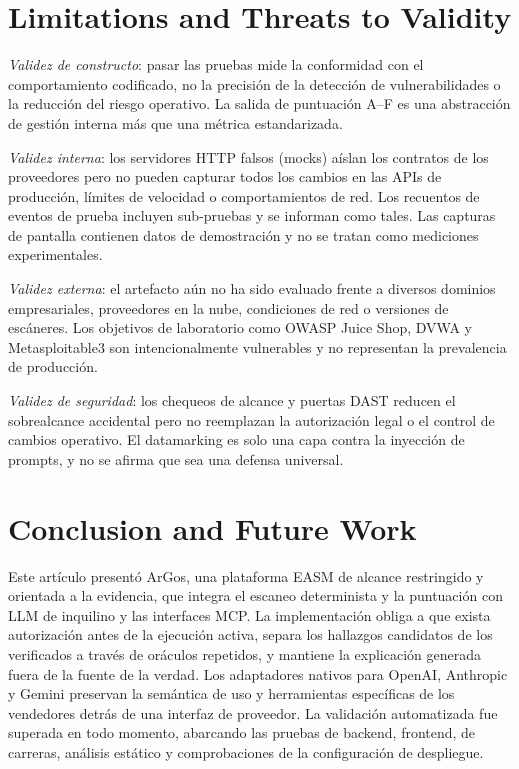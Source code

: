 \documentclass[conference,a4paper]{IEEEtran}
\newcommand{\argos}{ArGos\xspace}
\begin{document}
\section{Limitations and Threats to Validity}

\textit{Validez de constructo}: pasar las pruebas mide la conformidad con el comportamiento codificado, no la precisión de la detección de vulnerabilidades o la reducción del riesgo operativo. La salida de puntuación A--F es una abstracción de gestión interna más que una métrica estandarizada.

\textit{Validez interna}: los servidores HTTP falsos (mocks) aíslan los contratos de los proveedores pero no pueden capturar todos los cambios en las APIs de producción, límites de velocidad o comportamientos de red. Los recuentos de eventos de prueba incluyen sub-pruebas y se informan como tales. Las capturas de pantalla contienen datos de demostración y no se tratan como mediciones experimentales.

\textit{Validez externa}: el artefacto aún no ha sido evaluado frente a diversos dominios empresariales, proveedores en la nube, condiciones de red o versiones de escáneres. Los objetivos de laboratorio como OWASP Juice Shop, DVWA y Metasploitable3 son intencionalmente vulnerables y no representan la prevalencia de producción.

\textit{Validez de seguridad}: los chequeos de alcance y puertas DAST reducen el sobrealcance accidental pero no reemplazan la autorización legal o el control de cambios operativo. El datamarking es solo una capa contra la inyección de prompts, y no se afirma que sea una defensa universal.

\section{Conclusion and Future Work}

Este artículo presentó \argos, una plataforma EASM de alcance restringido y orientada a la evidencia, que integra el escaneo determinista y la puntuación con LLM de inquilino y las interfaces MCP. La implementación obliga a que exista autorización antes de la ejecución activa, separa los hallazgos candidatos de los verificados a través de oráculos repetidos, y mantiene la explicación generada fuera de la fuente de la verdad. Los adaptadores nativos para OpenAI, Anthropic y Gemini preservan la semántica de uso y herramientas específicas de los vendedores detrás de una interfaz de proveedor. La validación automatizada fue superada en todo momento, abarcando las pruebas de backend, frontend, de carreras, análisis estático y comprobaciones de la configuración de despliegue.
\end{document}
